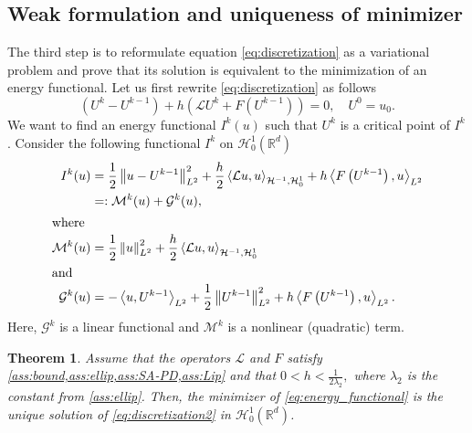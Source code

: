 \documentclass[11pt,a4paper,reqno]{amsart}
\numberwithin{equation}{section}
\theoremstyle{plain}
\newtheorem{theorem}{Theorem}[section]
\theoremstyle{definition}
\newcommand{\ip}[1]{\left\langle#1\right\rangle}
\newcommand{\cL}{\mathcal{L}}
\newcommand{\cH}{\mathcal{H}}
\newcommand{\R}{\mathbb{R}}
\newcommand{\norm}[1]{\left\|#1 \right\|} %
\begin{document}

\subsection{Weak formulation and uniqueness of minimizer}
\label{sec:weak}


The third step is to reformulate equation \eqref{eq:discretization} as a variational problem and prove that its solution is equivalent to the minimization of an energy functional. 
Let us first rewrite \eqref{eq:discretization} as follows
\begin{equation}
\label{eq:discretization2}
\left( U^k - U^{k - 1} \right) + h \left( \mathcal{L} U^k + F \left( U^{k - 1} \right) \right) = 0, \quad U^0  = u_0.
\end{equation}
We want to find an energy functional $I^k (u)$ such that $U^k$ is a critical point of $I^{k}$. 
Consider the following functional $I^k$ on $\mathcal{H}_0^1 (\R^d)$
\begin{align}
\label{eq:energy_functional}
I^k (u) 
    & = \frac{1}{2} \norm{u - U^{k - 1}}^2_{L^2} + \frac{h}{2} \ip{\cL  u,  u}_{\cH^{-1},\cH_0^1}   + h\ip{F \left( U^{k - 1} \right),u}_{L^2} \\ 
    & =: \mathcal{M}^k (u) + \mathcal{G}^k (u), \nonumber\\
\intertext{where} 
\mathcal{M}^k (u) & = \frac{1}{2} \norm{u}^2_{L^2} + \frac{h}{2} \ip{\cL  u,  u}_{\cH^{-1},\cH_0^1} \nonumber \\ 
\intertext{and} 
\mathcal{G}^k (u) & = - \ip{u, U^{k - 1}}_{L^2} + \frac{1}{2} \norm{U^{k - 1}}^2_{L^2} + h \ip{F \left( U^{k - 1} \right),u}_{L^2}. \nonumber
\end{align}
Here, $\mathcal{G}^k$ is a linear functional and $\mathcal{M}^k$ is a nonlinear (quadratic) term.

\begin{theorem}
\label{thm:var_to_pde}
Assume that the operators $\mathcal{L}$ and $F$ satisfy \cref{ass:bound,ass:ellip,ass:SA-PD,ass:Lip} and that $0<h<\frac{1}{2\lambda_2},$ where $\lambda_2$ is the constant from \cref{ass:ellip}. 
Then, the minimizer of \eqref{eq:energy_functional} is the unique solution of \eqref{eq:discretization2} in $\mathcal{H}_0^1 (\R^d)$.
\end{theorem}
\end{document}
